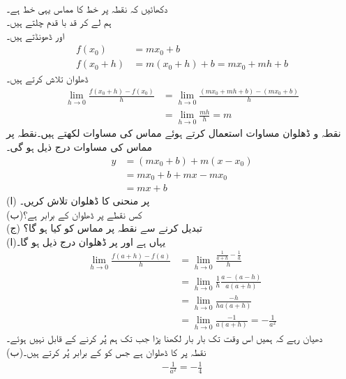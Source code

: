 \\
دکھائیں کہ نقطہ  پر خط  کا مماس یہی خط ہے۔\\
ہم  لے کر  قد با قدم چلتے ہیں۔\\
\quad {} اور  ڈھونڈتے ہیں۔
\begin{align*}
f(x_0)&=mx_0+b\\
f(x_0+h)&=m(x_0+h)+b=mx_0+mh+b
\end{align*}
\quad
ڈھلوان تلاش کرتے ہیں۔
\begin{align*}
\lim_{h\to 0}\frac{f(x_0+h)-f(x_0)}{h}&=\lim_{h\to 0}\frac{(mx_0+mh+b)-(mx_0+b)}{h}\\
&=\lim_{h\to 0}\frac{mh}{h}=m
\end{align*}
\quad
نقطہ و  ڈھلوان مساوات استعمال کرتے ہوئے مماس کی مساوات لکھتے ہیں۔نقطہ   پر مماس کی مساوات درج ذیل ہو گی۔
\begin{align*}
y&=(mx_0+b)+m(x-x_0)\\
&=mx_0+b+mx-mx_0\\
&=mx+b
\end{align*}
(ا)\quad {} پر منحنی  کا  ڈھلوان تلاش کریں۔\\
(ب)\quad کس نقطے پر ڈھلوان  کے برابر ہے؟\\
(ج)\quad {} تبدیل کرنے سے نقطہ  پر مماس کو کیا ہو گا؟\\
(ا)\quad یہاں  ہے اور  پر ڈھلوان درج ذیل ہو گا۔
\begin{align*}
\lim_{h\to 0}\frac{f(a+h)-f(a)}{h}&=\lim_{h\to 0}\frac{\tfrac{1}{a+h}-\tfrac{1}{a}}{h}\\
&=\lim_{h\to 0} \frac{1}{h}\frac{a-(a-h)}{a(a+h)}\\
&=\lim_{h\to 0}\frac{-h}{ha(a+h)}\\
&=\lim_{h\to 0}\frac{-1}{a(a+h)}=-\frac{1}{a^2}
\end{align*}
دھیان رہے کہ ہمیں اس وقت تک  بار بار  لکھنا پڑا جب تک ہم   پُر کرنے کے قابل نہیں ہوئے۔\\
(ب)\quad نقطہ  پر  کا  ڈھلوان  ہے جس کو  کے برابر پُر کرتے ہیں۔
\begin{align*}
-\tfrac{1}{a^2}=-\tfrac{1}{4}
\end{align*}
